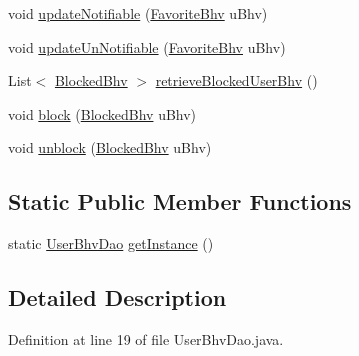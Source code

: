 \begin{DoxyCompactItemize}
\item 
void \hyperlink{classlab_1_1davidahn_1_1appshuttle_1_1collect_1_1bhv_1_1_user_bhv_dao_a9884bc1ec65c46edeab38d3dbbfd3c9b}{update\-Notifiable} (\hyperlink{classlab_1_1davidahn_1_1appshuttle_1_1view_1_1_favorite_bhv}{\-Favorite\-Bhv} u\-Bhv)
\item 
void \hyperlink{classlab_1_1davidahn_1_1appshuttle_1_1collect_1_1bhv_1_1_user_bhv_dao_a099111fae2af5ede8cc6cda35cafc49c}{update\-Un\-Notifiable} (\hyperlink{classlab_1_1davidahn_1_1appshuttle_1_1view_1_1_favorite_bhv}{\-Favorite\-Bhv} u\-Bhv)
\item 
\-List$<$ \hyperlink{classlab_1_1davidahn_1_1appshuttle_1_1view_1_1_blocked_bhv}{\-Blocked\-Bhv} $>$ \hyperlink{classlab_1_1davidahn_1_1appshuttle_1_1collect_1_1bhv_1_1_user_bhv_dao_a1e7dfd630cac9e84c4f06d1dc85657de}{retrieve\-Blocked\-User\-Bhv} ()
\item 
void \hyperlink{classlab_1_1davidahn_1_1appshuttle_1_1collect_1_1bhv_1_1_user_bhv_dao_a2e63c6c3d13922ff5a8c85dbf8fefcc3}{block} (\hyperlink{classlab_1_1davidahn_1_1appshuttle_1_1view_1_1_blocked_bhv}{\-Blocked\-Bhv} u\-Bhv)
\item 
void \hyperlink{classlab_1_1davidahn_1_1appshuttle_1_1collect_1_1bhv_1_1_user_bhv_dao_a74dab928bb1a7e2308a90c0c6896b889}{unblock} (\hyperlink{classlab_1_1davidahn_1_1appshuttle_1_1view_1_1_blocked_bhv}{\-Blocked\-Bhv} u\-Bhv)
\end{DoxyCompactItemize}
\subsection*{\-Static \-Public \-Member \-Functions}
\begin{DoxyCompactItemize}
\item 
static \hyperlink{classlab_1_1davidahn_1_1appshuttle_1_1collect_1_1bhv_1_1_user_bhv_dao}{\-User\-Bhv\-Dao} \hyperlink{classlab_1_1davidahn_1_1appshuttle_1_1collect_1_1bhv_1_1_user_bhv_dao_a9ef19f5e1ff5108d26dff21e09c791ee}{get\-Instance} ()
\end{DoxyCompactItemize}


\subsection{\-Detailed \-Description}


\-Definition at line 19 of file \-User\-Bhv\-Dao.\-java.



